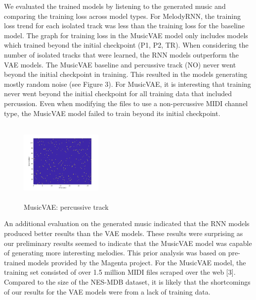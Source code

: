 \documentclass{article}
\begin{document}
We evaluated the trained models by listening to the generated music and comparing the training loss across model types. For MelodyRNN, the training loss trend for each isolated track was less than the training loss for the baseline model. The graph for training loss in the MusicVAE model only includes models which trained beyond the initial checkpoint (P1, P2, TR). When considering the number of isolated tracks that were learned, the RNN models outperform the VAE models. The MusicVAE baseline and percussive track (NO) never went beyond the initial checkpoint in training. This resulted in the models generating mostly random noise (see Figure 3). For MusicVAE, it is interesting that training never went beyond the initial checkpoint for all training data that included percussion. Even when modifying the files to use a non-percussive MIDI channel type, the MusicVAE model failed to train beyond its initial checkpoint.

\begin{figure}[htb!]
  \begin{minipage}{1.0\textwidth}
    \centering
    \includegraphics[height=4cm, width=4cm]{img/vae_no.jpg}
    \caption{MusicVAE: percussive track}
  \end{minipage}
\end{figure}

An additional evaluation on the generated music indicated that the RNN models produced better results than the VAE models. These results were surprising as our preliminary results seemed to indicate that the MusicVAE model was capable of generating more interesting melodies. This prior analysis was based on pre-trained models provided by the Magenta project. For the MusicVAE model, the training set consisted of over 1.5 million MIDI files scraped over the web [3]. Compared to the size of the NES-MDB dataset, it is likely that the shortcomings of our results for the VAE models were from a lack of training data.
\end{document}
